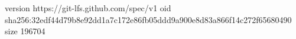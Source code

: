 version https://git-lfs.github.com/spec/v1
oid sha256:32edf44d79b8e92dd1a7c172e86fb05ddd9a900e8d83a866f14c272f65680490
size 196704
